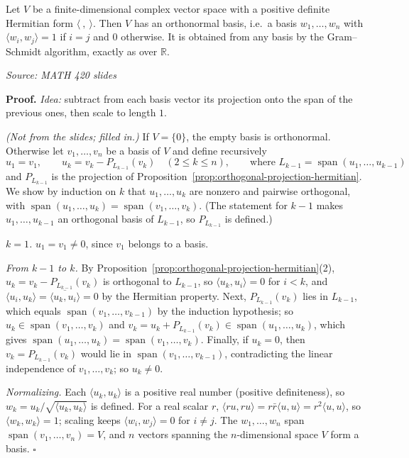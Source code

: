 \documentclass[11pt]{report}
\renewenvironment{proof}[1][Proof]{\noindent\textbf{#1.} }{\hfill$\square$\par\vspace{5pt}}
\newcommand{\srcline}[1]{\par\hfill{\footnotesize\textit{Source: #1}}}
\begin{document}
\begin{propbox}\label{prop:gram-schmidt-hermitian}
Let $V$ be a finite-dimensional complex vector space with a positive definite Hermitian form $\langle\ ,\ \rangle$. Then $V$ has an orthonormal basis, i.e.\ a basis $w_1, \ldots, w_n$ with $\langle w_i, w_j \rangle = 1$ if $i = j$ and $0$ otherwise. It is obtained from any basis by the Gram--Schmidt algorithm, exactly as over $\mathbb{R}$.
\srcline{MATH 420 slides}
\end{propbox}

\begin{proof}
\textit{Idea:} subtract from each basis vector its projection onto the span of the previous ones, then scale to length $1$.\par
\textit{(Not from the slides; filled in.)} If $V = \{0\}$, the empty basis is orthonormal. Otherwise let $v_1, \ldots, v_n$ be a basis of $V$ and define recursively
\[ u_1 = v_1, \qquad u_k = v_k - P_{L_{k-1}}(v_k) \quad (2 \leq k \leq n), \qquad \text{where } L_{k-1} = \operatorname{span}(u_1, \ldots, u_{k-1}) \]
and $P_{L_{k-1}}$ is the projection of Proposition~\ref{prop:orthogonal-projection-hermitian}. We show by induction on $k$ that $u_1, \ldots, u_k$ are nonzero and pairwise orthogonal, with $\operatorname{span}(u_1, \ldots, u_k) = \operatorname{span}(v_1, \ldots, v_k)$. (The statement for $k - 1$ makes $u_1, \ldots, u_{k-1}$ an orthogonal basis of $L_{k-1}$, so $P_{L_{k-1}}$ is defined.)

\emph{$k = 1$.} $u_1 = v_1 \neq 0$, since $v_1$ belongs to a basis.

\emph{From $k - 1$ to $k$.} By Proposition~\ref{prop:orthogonal-projection-hermitian}(2), $u_k = v_k - P_{L_{k-1}}(v_k)$ is orthogonal to $L_{k-1}$, so $\langle u_k, u_i \rangle = 0$ for $i < k$, and $\langle u_i, u_k \rangle = \overline{\langle u_k, u_i \rangle} = 0$ by the Hermitian property. Next, $P_{L_{k-1}}(v_k)$ lies in $L_{k-1}$, which equals $\operatorname{span}(v_1, \ldots, v_{k-1})$ by the induction hypothesis; so $u_k \in \operatorname{span}(v_1, \ldots, v_k)$ and $v_k = u_k + P_{L_{k-1}}(v_k) \in \operatorname{span}(u_1, \ldots, u_k)$, which gives $\operatorname{span}(u_1, \ldots, u_k) = \operatorname{span}(v_1, \ldots, v_k)$. Finally, if $u_k = 0$, then $v_k = P_{L_{k-1}}(v_k)$ would lie in $\operatorname{span}(v_1, \ldots, v_{k-1})$, contradicting the linear independence of $v_1, \ldots, v_k$; so $u_k \neq 0$.

\emph{Normalizing.} Each $\langle u_k, u_k \rangle$ is a positive real number (positive definiteness), so $w_k = u_k / \sqrt{\langle u_k, u_k \rangle}$ is defined. For a real scalar $r$, $\langle r u, r u \rangle = r \bar r \langle u, u \rangle = r^2 \langle u, u \rangle$, so $\langle w_k, w_k \rangle = 1$; scaling keeps $\langle w_i, w_j \rangle = 0$ for $i \neq j$. The $w_1, \ldots, w_n$ span $\operatorname{span}(v_1, \ldots, v_n) = V$, and $n$ vectors spanning the $n$-dimensional space $V$ form a basis.
\end{proof}
\end{document}
